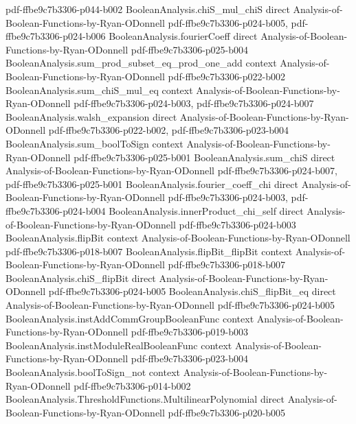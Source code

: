 \begin{lemma}
  {pdf-ffbe9c7b3306-p044-b002}
\proofstep
  {BooleanAnalysis.chiS_mul_chiS}
  {direct}
  {Analysis-of-Boolean-Functions-by-Ryan-ODonnell}
  {pdf-ffbe9c7b3306-p024-b005,
    pdf-ffbe9c7b3306-p024-b006}
\proofstep
  {BooleanAnalysis.fourierCoeff}
  {direct}
  {Analysis-of-Boolean-Functions-by-Ryan-ODonnell}
  {pdf-ffbe9c7b3306-p025-b004}
\proofstep
  {BooleanAnalysis.sum_prod_subset_eq_prod_one_add}
  {context}
  {Analysis-of-Boolean-Functions-by-Ryan-ODonnell}
  {pdf-ffbe9c7b3306-p022-b002}
\proofstep
  {BooleanAnalysis.sum_chiS_mul_eq}
  {context}
  {Analysis-of-Boolean-Functions-by-Ryan-ODonnell}
  {pdf-ffbe9c7b3306-p024-b003,
    pdf-ffbe9c7b3306-p024-b007}
\proofstep
  {BooleanAnalysis.walsh_expansion}
  {direct}
  {Analysis-of-Boolean-Functions-by-Ryan-ODonnell}
  {pdf-ffbe9c7b3306-p022-b002,
    pdf-ffbe9c7b3306-p023-b004}
\proofstep
  {BooleanAnalysis.sum_boolToSign}
  {context}
  {Analysis-of-Boolean-Functions-by-Ryan-ODonnell}
  {pdf-ffbe9c7b3306-p025-b001}
\proofstep
  {BooleanAnalysis.sum_chiS}
  {direct}
  {Analysis-of-Boolean-Functions-by-Ryan-ODonnell}
  {pdf-ffbe9c7b3306-p024-b007,
    pdf-ffbe9c7b3306-p025-b001}
\proofstep
  {BooleanAnalysis.fourier_coeff_chi}
  {direct}
  {Analysis-of-Boolean-Functions-by-Ryan-ODonnell}
  {pdf-ffbe9c7b3306-p024-b003,
    pdf-ffbe9c7b3306-p024-b004}
\proofstep
  {BooleanAnalysis.innerProduct_chi_self}
  {direct}
  {Analysis-of-Boolean-Functions-by-Ryan-ODonnell}
  {pdf-ffbe9c7b3306-p024-b003}
\proofstep
  {BooleanAnalysis.flipBit}
  {context}
  {Analysis-of-Boolean-Functions-by-Ryan-ODonnell}
  {pdf-ffbe9c7b3306-p018-b007}
\proofstep
  {BooleanAnalysis.flipBit_flipBit}
  {context}
  {Analysis-of-Boolean-Functions-by-Ryan-ODonnell}
  {pdf-ffbe9c7b3306-p018-b007}
\proofstep
  {BooleanAnalysis.chiS_flipBit}
  {direct}
  {Analysis-of-Boolean-Functions-by-Ryan-ODonnell}
  {pdf-ffbe9c7b3306-p024-b005}
\proofstep
  {BooleanAnalysis.chiS_flipBit_eq}
  {direct}
  {Analysis-of-Boolean-Functions-by-Ryan-ODonnell}
  {pdf-ffbe9c7b3306-p024-b005}
\proofstep
  {BooleanAnalysis.instAddCommGroupBooleanFunc}
  {context}
  {Analysis-of-Boolean-Functions-by-Ryan-ODonnell}
  {pdf-ffbe9c7b3306-p019-b003}
\proofstep
  {BooleanAnalysis.instModuleRealBooleanFunc}
  {context}
  {Analysis-of-Boolean-Functions-by-Ryan-ODonnell}
  {pdf-ffbe9c7b3306-p023-b004}
\proofstep
  {BooleanAnalysis.boolToSign_not}
  {context}
  {Analysis-of-Boolean-Functions-by-Ryan-ODonnell}
  {pdf-ffbe9c7b3306-p014-b002}
\proofstep
  {BooleanAnalysis.ThresholdFunctions.MultilinearPolynomial}
  {direct}
  {Analysis-of-Boolean-Functions-by-Ryan-ODonnell}
  {pdf-ffbe9c7b3306-p020-b005}

\end{lemma}
